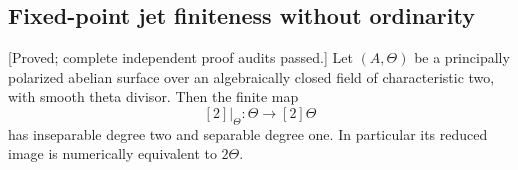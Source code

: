 \subsection{Fixed-point jet finiteness without ordinarity}
\label{subsec:nonordinary-ppav-fixed-jets-candidate}

\begin{lemma}
\label{lem:all-theta-double-image-candidate}
\textup{[Proved; complete independent proof audits passed.]}
Let $(A,\Theta)$ be a principally polarized abelian surface
over an algebraically closed field of characteristic two,
with smooth theta divisor. Then the finite map
\[
                         [2]|_\Theta:\Theta\longrightarrow[2]\Theta
\]
has inseparable degree two and separable degree one. In
particular its reduced image is numerically equivalent to
$2\Theta$.
\end{lemma}
